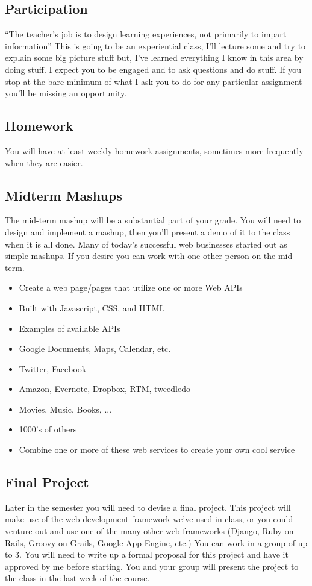 \documentclass[11pt,twocolumn]{article}
\begin{document}
\subsection*{Participation}

``The teacher's job is to design learning experiences, not primarily to impart information''  This is going to be an experiential class, I'll lecture some and try to explain some big picture stuff but, I've learned everything I know in this area by doing stuff.  I expect you to be engaged and to ask questions and do stuff.  If you stop at the bare minimum of what I ask you to do for any particular assignment you'll be missing an opportunity.

\subsection*{Homework}

You will have at least weekly homework assignments, sometimes more frequently when they are easier.

\subsection*{Midterm Mashups}

The mid-term mashup will be a substantial part of your grade.  You will need to design and implement a mashup, then you'll present a demo of it to the class when it is all done.  Many of today's successful web businesses started out as simple mashups.  If you desire you can work with one other person on the mid-term.
	\begin{itemize}
	    \item Create a web page/pages that utilize one or more Web APIs
	    \item Built with Javascript, CSS, and HTML
	    \item Examples of available APIs
	    \item Google Documents, Maps, Calendar, etc.
	    \item Twitter, Facebook
	    \item Amazon, Evernote, Dropbox, RTM, tweedledo
	    \item Movies, Music, Books, ...
	    \item 1000's of others
	    \item Combine one or more of these web services to create your own cool service
	\end{itemize}

\subsection{Final Project} %
\label{sub:final_project}
Later in the semester you will need to devise a final project.  This project will make use of the web development framework we've used in class, or you could venture out and use one of the many other web frameworks (Django, Ruby on Rails, Groovy on Grails, Google App Engine, etc.)  You can work in a group of up to 3.  You will need to write up a formal proposal for this project and have it approved by me before starting.  You and your group will present the project to the class in the last week of the course.
\end{document}
